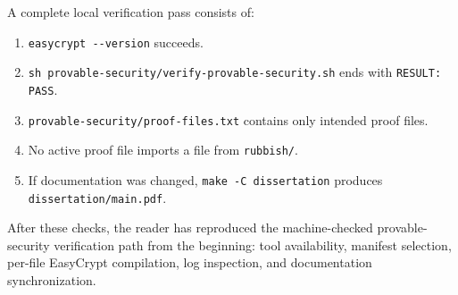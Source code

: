 \documentclass[11pt]{article}
\newcommand{\file}[1]{\nolinkurl{#1}}
\newcommand{\ec}[1]{\nolinkurl{#1}}
\begin{document}
A complete local verification pass consists of:

\begin{enumerate}[leftmargin=*]
  \item \file{easycrypt --version} succeeds.
  \item \file{sh provable-security/verify-provable-security.sh} ends with
  \ec{RESULT: PASS}.
  \item \file{provable-security/proof-files.txt} contains only intended proof
  files.
  \item No active proof file imports a file from \file{rubbish/}.
  \item If documentation was changed, \file{make -C dissertation} produces
  \file{dissertation/main.pdf}.
\end{enumerate}

After these checks, the reader has reproduced the machine-checked
provable-security verification path from the beginning: tool availability,
manifest selection, per-file EasyCrypt compilation, log inspection, and
documentation synchronization.
\end{document}

